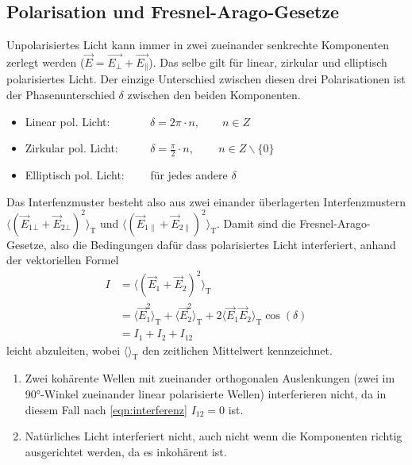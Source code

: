     \subsection{Polarisation und Fresnel-Arago-Gesetze}
        Unpolarisiertes Licht kann immer in zwei zueinander senkrechte Komponenten zerlegt werden ($\vec{E} = \vec{E_{\bot}} + \vec{E_{\parallel}}$). Das selbe gilt für linear, zirkular und elliptisch polarisiertes Licht. Der einzige Unterschied zwischen diesen drei Polarisationen ist der Phasenunterschied $\delta$ zwischen den beiden Komponenten.
        \begin{itemize}
            \item Linear pol. Licht: $\qquad \quad \; \delta = 2\pi \cdot n, \qquad n \in Z$
            \item Zirkular pol. Licht: $\qquad \; \; \delta = \frac{\pi}{2} \cdot n, \qquad \, n \in Z \backslash \{0\}$
            \item Elliptisch pol. Licht: $\qquad$für jedes andere $\delta$
        \end{itemize}
        Das Interfenzmuster besteht also aus zwei einander überlagerten Interfenzmustern $\langle\left(\vec{E}_{1\bot} + \vec{E}_{2\bot}\right)^2\rangle_{\text{T}}$ und $\langle\left(\vec{E}_{1\parallel} + \vec{E}_{2\parallel}\right)^2\rangle_{\text{T}}$.
        Damit sind die Fresnel-Arago-Gesetze, also die Bedingungen dafür dass polarisiertes Licht interferiert, anhand der vektoriellen Formel
        \begin{align}
            I &= \langle\left(\vec{E}_1 + \vec{E}_2\right)^2\rangle_{\text{T}} \nonumber\\
            &= \langle\vec{E}^2_1\rangle_{\text{T}} + \langle\vec{E}^2_2\rangle_{\text{T}} + 2\langle\vec{E}_1\vec{E}_2\rangle_{\text{T}} \cos(\delta) \\
            &= I_1 + I_2 + I_{12}
            \label{eqn:interferenz}
        \end{align}
        leicht abzuleiten, wobei $\langle\rangle_{\text{T}}$ den zeitlichen Mittelwert kennzeichnet.
        \begin{enumerate}
            \item Zwei kohärente Wellen mit zueinander orthogonalen Auslenkungen (zwei im 90°-Winkel zueinander linear polarisierte Wellen) interferieren nicht, da in diesem Fall nach \eqref{eqn:interferenz} $I_{12} = 0$ ist.
            \item Natürliches Licht interferiert nicht, auch nicht wenn die Komponenten richtig ausgerichtet werden, da es inkohärent ist.
        \end{enumerate}
    
